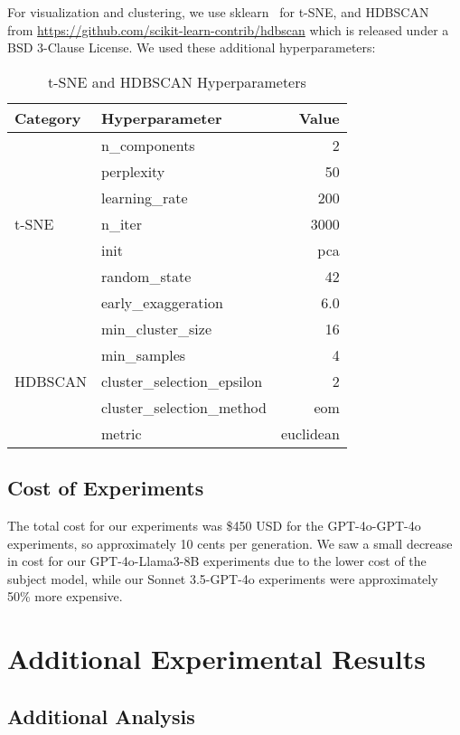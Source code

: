 For visualization and clustering, we use sklearn~\citep{scikit-learn} for t-SNE, and HDBSCAN~\citep{mcinnes2017hdbscan} from \url{https://github.com/scikit-learn-contrib/hdbscan} which is released under a BSD 3-Clause License. We used these additional hyperparameters:

\begin{table}[h!]
\centering
\caption{t-SNE and HDBSCAN Hyperparameters}
\label{tab:tsne_dbscan_hyp}
\begin{tabular}{@{}llr@{}}
\toprule
\textbf{Category} & \textbf{Hyperparameter} & \textbf{Value} \\
\midrule
\multirow{7}{*}{t-SNE} & n\_components & 2 \\
 & perplexity & 50 \\
 & learning\_rate & 200 \\
 & n\_iter & 3000 \\
 & init & pca \\
 & random\_state & 42 \\
 & early\_exaggeration & 6.0 \\
\midrule
\multirow{5}{*}{HDBSCAN} & min\_cluster\_size & 16 \\
 & min\_samples & 4 \\
 & cluster\_selection\_epsilon & 2 \\
 & cluster\_selection\_method & eom \\
 & metric & euclidean \\
\bottomrule
\end{tabular}
\end{table}

\subsection{Cost of Experiments}
\label{appsubsec:cost}
The total cost for our experiments was \$450 USD for the GPT-4o-GPT-4o experiments, so approximately 10 cents per generation.
We saw a small decrease in cost for our GPT-4o-Llama3-8B experiments due to the lower cost of the subject model, while our Sonnet 3.5-GPT-4o experiments were approximately 50\% more expensive.

\clearpage

\section{Additional Experimental Results}
\label{appsec:add_exp}

\subsection{Additional Analysis}
\label{appsubsec:gpt4o_analysis}

